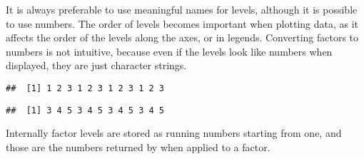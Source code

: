 \documentclass[paper=a4,headsepline,BCOR=12mm,twoside,open=right,%
titlepage,headings=small,fontsize=10pt,index=totoc,bibliography=totoc,%
captions=tableheading,captions=nooneline]{scrbook}\usepackage{knitr}
\begin{document}
\begin{knitrout}\footnotesize
{}\color{fgcolor}\begin{kframe}
\begin{alltt}
 \hlkwb{<-} \hlstd{(}\hlstd{,} \hlstd{,} \hlstd{,} \hlstd{,} \hlstd{,} \hlstd{)}
 \hlkwb{<-} 
 \hlkwb{<-}  \hlstd{=}\hlstd{(}\hlstd{,} \hlstd{))}
\end{alltt}
\end{kframe}
\end{knitrout}

It is always preferable to use meaningful names for levels, although it is possible to use numbers. The order of levels becomes important when plotting data, as it affects the order of the levels along the axes, or in legends. Converting factors to numbers is not intuitive, because even if the levels look like numbers when displayed, they are just character strings.

\begin{knitrout}\footnotesize
{}\color{fgcolor}\begin{kframe}
\begin{alltt}
 \hlkwb{<-} \hlstd{(}\hlopt{:}\hlstd{,} \hlstd{)}
 \hlkwb{<-} 
\end{alltt}
\begin{verbatim}
##  [1] 1 2 3 1 2 3 1 2 3 1 2 3
\end{verbatim}
\begin{alltt}
\hlstd{(}
\end{alltt}
\begin{verbatim}
##  [1] 3 4 5 3 4 5 3 4 5 3 4 5
\end{verbatim}
\end{kframe}
\end{knitrout}

Internally factor levels are stored as running numbers starting from one, and those are the numbers returned by  when applied to a factor.
\end{document}
